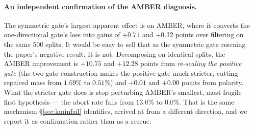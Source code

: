 \documentclass{article}
\theoremstyle{plain}
\theoremstyle{definition}
\theoremstyle{remark}
\begin{document}
\paragraph{An independent confirmation of the AMBER diagnosis.}
The symmetric gate's largest apparent effect is on AMBER, where it converts the one-directional
gate's loss into gains of $+0.71$ and $+0.32$ points over filtering on the same $500$ splits. It
would be easy to sell that as the symmetric gate rescuing
the paper's negative result. It is not. Decomposing on identical splits, the AMBER improvement is
$+10.75$ and $+12.28$ points from \emph{re-scaling the positive gate} (the two-gate construction
makes the positive gate much stricter, cutting repaired mass from $1.69\%$ to $0.51\%$) and
$+0.01$ and $+0.00$ points from polarity. What the stricter gate does is stop perturbing AMBER's
smallest, most fragile first hypothesis --- the abort rate falls from $13.0\%$ to $0.0\%$. That is
the same mechanism \S\ref{sec:kminfail} identifies, arrived at from a different direction, and we
report it as confirmation rather than as a rescue.
\end{document}
